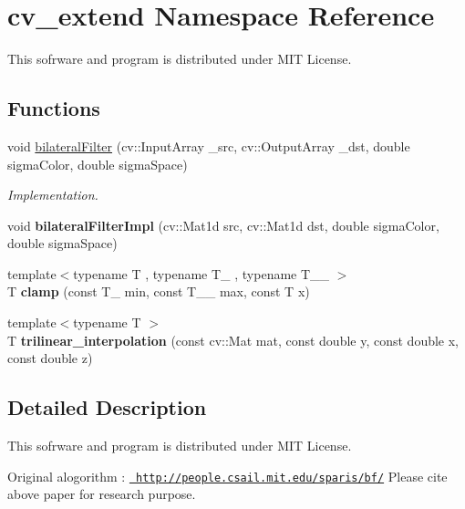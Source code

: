 \section{cv\+\_\+extend Namespace Reference}
\label{namespacecv__extend}


This sofrware and program is distributed under M\+IT License.  


\subsection*{Functions}
\begin{DoxyCompactItemize}
\item 
\mbox{\label{namespacecv__extend_a2bfc33f05bbb6e235e984b33647abe30}} 
void \mbox{\hyperlink{namespacecv__extend_a2bfc33f05bbb6e235e984b33647abe30}{bilateral\+Filter}} (cv\+::\+Input\+Array \+\_\+src, cv\+::\+Output\+Array \+\_\+dst, double sigma\+Color, double sigma\+Space)
\begin{DoxyCompactList}\small\item\em Implementation. \end{DoxyCompactList}\item 
\mbox{\label{namespacecv__extend_ad63779611742d7ce3b6cf45184734e39}} 
void {\bfseries bilateral\+Filter\+Impl} (cv\+::\+Mat1d src, cv\+::\+Mat1d dst, double sigma\+Color, double sigma\+Space)
\item 
\mbox{\label{namespacecv__extend_a27b3ee63437f807a97f75586e4478638}} 
{\footnotesize template$<$typename T , typename T\+\_\+ , typename T\+\_\+\+\_\+ $>$ }\\T {\bfseries clamp} (const T\+\_\+ min, const T\+\_\+\+\_\+ max, const T x)
\item 
\mbox{\label{namespacecv__extend_a7c5f8aaf3530641456744f464f3ed816}} 
{\footnotesize template$<$typename T $>$ }\\T {\bfseries trilinear\+\_\+interpolation} (const cv\+::\+Mat mat, const double y, const double x, const double z)
\end{DoxyCompactItemize}


\subsection{Detailed Description}
This sofrware and program is distributed under M\+IT License. 

Original alogorithm \+: \href{http://people.csail.mit.edu/sparis/bf/}{\texttt{ http\+://people.\+csail.\+mit.\+edu/sparis/bf/}} Please cite above paper for research purpose.


